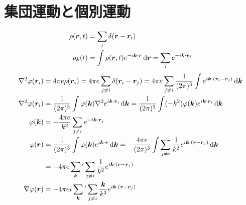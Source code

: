 \documentclass[a4paper,11pt]{jlreq}
\begin{document}
\section{集団運動と個別運動}
\begin{align}
  \rho(\rr, t)  & = \sum_{i}\delta(\rr - \rr_i)                                             \\
  \rho_{\kk}(t) & = \int\rho(\rr, t)e^{-i\kk\cdot\rr}\dl{\rr} = \sum_{i}e^{-i\kk\cdot\rr_i}
\end{align}
\begin{align}
  \nabla^2\varphi(\rr_i) & = 4\pi e\rho(\rr_i) = 4\pi e\sum_{j \neq i}\delta(\rr_i - \rr_j) = 4\pi e\sum_{j \neq i}\frac{1}{(2\pi)^3}\int e^{i\kk\cdot(\rr_i - \rr_j)}\dl{\kk}        \\
  \nabla^2\varphi(\rr_i) & = \frac{1}{(2\pi)^3}\int\varphi(\kk)\nabla^2e^{i\kk\cdot\rr_i}\dl{\kk} = \frac{1}{(2\pi)^3}\int(-k^2)\varphi(\kk)e^{i\kk\cdot\rr_i}\dl{\kk}                \\
  \varphi(\kk)           & = -\frac{4\pi e}{k^2}\sum_{j \neq i}e^{-i\kk\cdot\rr_j}                                                                                                    \\
  \varphi(\rr)           & = \frac{1}{(2\pi)^3}\int\varphi(\kk)e^{i\kk\cdot\rr}\dl{\kk} = -\frac{4\pi e}{(2\pi)^3}\int\sum_{j \neq i} \frac{1}{k^2}e^{i\kk\cdot(\rr - \rr_j)}\dl{\kk} \\
                         & = -4\pi e\sum_{\kk}{}'\sum_{j \neq i} \frac{1}{k^2}e^{i\kk\cdot(\rr - \rr_j)}                                                                              \\
  \nabla\varphi(\rr)     & = -4\pi ei\sum_{\kk}{}'\sum_{j \neq i} \frac{\kk}{k^2}e^{i\kk\cdot(\rr - \rr_j)}
\end{align}
\end{document}
